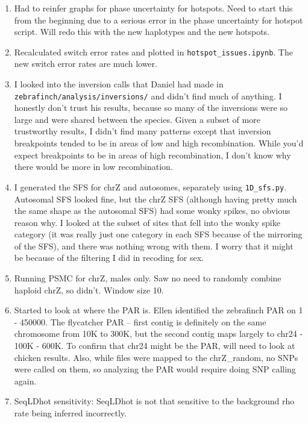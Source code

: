 \documentclass[idxtotoc,hyperref,openany,oneside]{labbook} %
\begin{document}
\begin{enumerate}
\item Had to reinfer graphs for phase uncertainty for hotspots. Need to start this from the beginning due to a serious error in the phase uncertainty for hotspot script. Will redo this with the new haplotypes and the new hotspots.
\item Recalculated switch error rates and plotted in \verb+hotspot_issues.ipynb+. The new switch error rates are much lower.
\item I looked into the inversion calls that Daniel had made in \verb+zebrafinch/analysis/inversions/+ and didn't find much of anything. I honestly don't trust his results, because so many of the inversions were so large and were shared between the species. Given a subset of more trustworthy results, I didn't find many patterns except that inversion breakpoints tended to be in areas of low and high recombination. While you'd expect breakpoints to be in areas of high recombination, I don't know why there would be more in low recombination.
\item I generated the SFS for chrZ and autosomes, separately using \verb+1D_sfs.py+. Autosomal SFS looked fine, but the chrZ SFS (although having pretty much the same shape as the autosomal SFS) had some wonky spikes, no obvious reason why. I looked at the subset of sites that fell into the wonky spike category (it was really just one category in each SFS because of the mirroring of the SFS), and there was nothing wrong with them. I worry that it might be because of the filtering I did in recoding for sex.
\item Running PSMC for chrZ, males only. Saw no need to randomly combine haploid chrZ, so didn't. Window size 10. 
\item Started to look at where the PAR is. Ellen identified the zebrafinch PAR on 1 - 450000. The flycatcher PAR -- first contig is definitely on the same chromosome from 10K to 300K, but the second contig maps largely to chr24 - 100K - 600K. To confirm that chr24 might be the PAR, will need to look at chicken results. Also, while files were mapped to the chrZ\_random, no SNPs were called on them, so analyzing the PAR would require doing SNP calling again.
\item SeqLDhot sensitivity: SeqLDhot is not that sensitive to the background rho rate being inferred incorrectly.
\end{enumerate}
\end{document}
